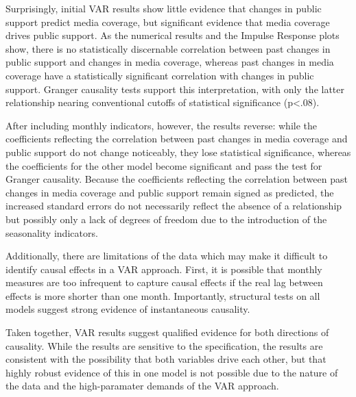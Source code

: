 \documentclass[12pt,article]{article}
\begin{document}
Surprisingly, initial VAR results show little evidence that changes in
public support predict media coverage, but significant evidence that
media coverage drives public support. As the numerical results and the
Impulse Response plots show, there is no statistically discernable
correlation between past changes in public support and changes in media
coverage, whereas past changes in media coverage have a statistically
significant correlation with changes in public support. Granger
causality tests support this interpretation, with only the latter
relationship nearing conventional cutoffs of statistical significance
(p\textless{}.08).

After including monthly indicators, however, the results reverse: while
the coefficients reflecting the correlation between past changes in
media coverage and public support do not change noticeably, they lose
statistical significance, whereas the coefficients for the other model
become significant and pass the test for Granger causality. Because the
coefficients reflecting the correlation between past changes in media
coverage and public support remain signed as predicted, the increased
standard errors do not necessarily reflect the absence of a relationship
but possibly only a lack of degrees of freedom due to the introduction
of the seasonality indicators.

Additionally, there are limitations of the data which may make it
difficult to identify causal effects in a VAR approach. First, it is
possible that monthly measures are too infrequent to capture causal
effects if the real lag between effects is more shorter than one month.
Importantly, structural tests on all models suggest strong evidence of
instantaneous causality.

Taken together, VAR results suggest qualified evidence for both
directions of causality. While the results are sensitive to the
specification, the results are consistent with the possibility that both
variables drive each other, but that highly robust evidence of this in
one model is not possible due to the nature of the data and the
high-paramater demands of the VAR approach. \pagebreak
\end{document}
